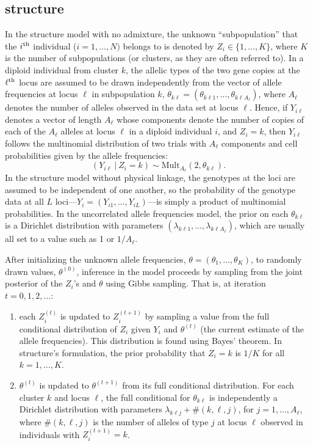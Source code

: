 \subsection*{{\sc structure}}
In the {\sc structure} model with no admixture, the unknown ``subpopulation'' that the 
$i^\mathrm{th}$ individual ($i=1,\ldots,N)$ belongs to is denoted by $Z_i \in \{1,\ldots,K\}$, 
where $K$ is the 
number of subpopulations (or clusters, as they are often referred to).  
In a diploid individual from cluster $k$, the 
allelic types of the two gene copies at the $\ell^\mathrm{th}$ locus are assumed
to be drawn independently from the vector of allele frequencies at
locus $\ell$ in subpopulation $k$,  $\theta_{k\ell}=(\theta_{k\ell 1},\ldots,\theta_{k\ell A_\ell})$, where 
$A_\ell$ 
denotes the number of alleles observed in the data set at locus $\ell$.
Hence, if $Y_{i\ell}$ denotes a vector of length $A_\ell$ whose components denote the 
number
of copies of each of the $A_\ell$ alleles at locus $\ell$ in a diploid individual $i$, and 
$Z_i=k$, then $Y_{i\ell}$ follows the multinomial distribution of two trials with
$A_\ell$  components and cell probabilities given by the allele frequencies: 
\begin{equation}
(Y_{i\ell}~|~Z_i=k) \sim \mathrm{Mult}_{A_\ell}(2, \theta_{k\ell}).
\end{equation}
In the {\sc structure} model without physical linkage, the genotypes at the loci are assumed to
be independent of one another, so the probability of the genotype data at
all $L$ loci---$Y_i=(Y_{i1},\ldots,Y_{iL})$---is simply a product of multinomial 
probabilities.
In the uncorrelated allele frequencies model, the prior on each $\theta_{k\ell}$ is a
Dirichlet distribution with parameters $(\lambda_{k\ell1},\ldots,\lambda_{k\ell A_
\ell})$,
which are usually all set to a value such as 1 or $1/A_\ell$.  

After initializing the unknown allele frequencies, $\theta = (\theta_1,\ldots,\theta_K)$, to randomly drawn values,
$\theta^{(0)}$, inference in the model proceeds by sampling from the joint posterior of the 
$Z_i$'s and $\theta$ using Gibbs sampling.  That is,
at iteration $t = 0, 1, 2, \ldots$:
\begin{enumerate}
\item each $Z^{(t)}_i$ is updated to $Z^{(t+1)}_i$ by sampling a value from 
the full conditional distribution of $Z_i$ given
$Y_i$ and $\theta^{(t)}$ (the current estimate of the allele frequencies).  This
distribution is found using Bayes' theorem. In {\sc structure}'s formulation, the 
prior probability that $Z_i=k$ is $1/K$ for all $k=1,\ldots, K$.     
\item $\theta^{(t)}$ is updated to $\theta^{(t+1)}$ from its full conditional distribution.  For each 
cluster
$k$ and locus $\ell$, the full conditional for $\theta_{k\ell}$ is independently a 
Dirichlet distribution with parameters $\lambda_{k\ell j} + \#(k,\ell,j)$, for 
$j=1,\ldots, A_\ell$,
where $\#(k,\ell,j)$ is the number of alleles of type $j$ at locus $\ell$ observed in 
individuals with $Z^{(t+1)}_i = k$.   
\end{enumerate}


